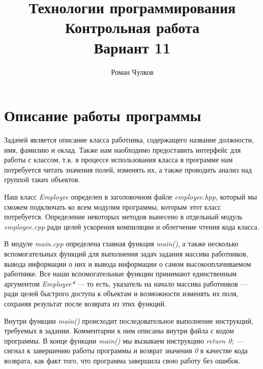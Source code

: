 \documentclass{article}
\title{Технологии программирования \large \\ Контрольная работа\\ \bigskip{}  \huge{Вариант 11} }
\author{Роман Чулков}
\begin{document}
\maketitle
\section{Описание работы программы}

Задачей является описание класса работника, содержащего название должности, имя, фамилию и оклад. Также нам наобходимо предоставить интерфейс для работы с классом, т.к. в процессе использования класса в программе нам потребуется читать значения полей, изменять их, а также проводить анализ над группой таких объектов.

Наш класс \emph{Employee} определен в заголовочном файле \emph{employee.hpp}, который мы сможем подключать ко всем модулям программы, которым этот класс потребуется. Определение некоторых методов вынесено в отдельный модуль \emph{employee.cpp} ради целей ускорения компиляции и облегчение чтения кода класса.

В модуле \emph{main.cpp} определена главная функция \emph{main()}, а также несколько вспомогательных функций для выполнения задач задания массива работников, вывода информации о них и вывода информации о самом высокооплачиваемом работнике. Все наши вспомогательные функции принимают единственным аргументом \emph{Employee*} --- то есть, указатель на начало массива работников --- ради целей быстрого доступа к объектам и возможности изменять их поля, сохраняя результат после возврата из этих функций.

Внутри функции \emph{main()} происходит последовательное выполнение инструкций, требуемых в задании. Комментарии к ним описаны внутри файла с кодом программы. В конце функции \emph{main()} мы вызываем инструкцию \emph{return 0;} --- сигнал к завершению работы программы и возврат значения \emph{0} в качестве кода возврата, как факт того, что программа завершила свою работу без ошибок.

\pagebreak
\end{document}
